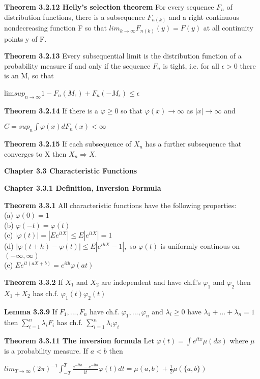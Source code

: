 \documentclass{article}
\begin{document}
\textbf {Theorem 3.2.12 Helly's selection theorem} For every sequence $F_n$ of distribution functions, there is a subsequence $F_{n(k)}$ and a right continuous nondecreasing function F so that $lim_{k \to \infty} F_{n(k)} (y) = F(y)$ at all continuity points y of F.

\textbf {Theorem 3.2.13} Every subsequential limit is the distribution function of a probability measure if and only if the sequence $F_n$ is tight, i.e. for all $\epsilon > 0$ there is an M, so that
\begin{center}
lim$sup_{n\to \infty}1 - F_n (M_\epsilon) + F_n (-M_\epsilon) \leq \epsilon$
\end{center}

\textbf {Theorem 3.2.14} If there is a $\varphi \geq 0$ so that $\varphi (x) \to \infty$ as $|x| \to \infty$ and 
\begin{center}
$C = sup_n \int \varphi(x) dF_n (x) < \infty$
\end{center}

\textbf {Theorem 3.2.15} If each subsequence of $X_n$ has a further subsequence that converges to X then $X_n \Rightarrow X$.

\textbf {Chapter 3.3 Characteristic Functions}

\textbf {Chapter 3.3.1 Definition, Inversion Formula}

\textbf {Theorem 3.3.1} All characteristic functions have the following properties: \\
(a) $\varphi(0) = 1 $ \\
(b) $\varphi(-t) = \bar{\varphi(t)}$ \\
(c) $| \varphi(t)| = |Ee^{itX}| \leq E|e^{itX}| = 1$ \\ 
(d) $| \varphi(t + h) - \varphi(t)| \leq E|e^{ihX}-1|,$ so $\varphi(t)$ is uniformly continous on $(-\infty, \infty)$ \\
(e) $E e^{it(aX + b)} = e^{itb} \varphi(at)$

\textbf {Theorem 3.3.2} If $X_1$ and $X_2$ are independent and have ch.f.'s $\varphi_1$ and $\varphi_2$ then $X_1 + X_2$ has ch.f. $\varphi_1(t) \varphi_2(t)$

\textbf {Lemma 3.3.9} If $F_1 ,..., F_n$ have ch.f. $\varphi_1 ,..., \varphi_n$ and $\lambda_i \geq 0$ have $\lambda_1 + \dots + \lambda_n = 1$ then $\sum_{i=1}^n \lambda_i F_i$ has ch.f. $\sum_{i=1}^n \lambda_i \varphi_i$

\textbf {Theorem 3.3.11 The inversion formula} Let $\varphi(t) = \int e^{itx} \mu (dx)$ where $\mu$ is a probability measure. If $a < b$ then
\begin{center}
$lim_{T \to \infty} (2 \pi)^{-1} \int_{-T}^{T} \frac{e^{-ita} - e^{-itb}}{it} \varphi(t) dt = \mu (a,b) + \frac{1}{2} \mu (\{a,b\})$
\end{center}
\end{document}
